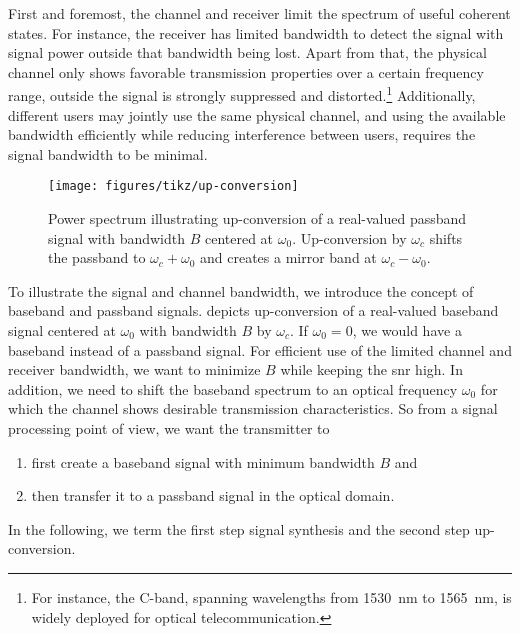 First and foremost, the channel and receiver limit the spectrum of useful coherent states.
For instance, the receiver has limited bandwidth to detect the signal with signal power outside that bandwidth being lost.
Apart from that, the physical channel only shows favorable transmission properties over a certain frequency range, outside the signal is strongly suppressed and distorted.\footnote{For instance, the C-band, spanning wavelengths from \SI{1530}{\nano\meter} to \SI{1565}{\nano\meter}, is widely deployed for optical telecommunication.}
Additionally, different users may jointly use the same physical channel, and using the available bandwidth efficiently while reducing interference between users, requires the signal bandwidth to be minimal.
\begin{figure}[htb]
	\centering
	\texttt{[image: figures/tikz/up-conversion]}
	\caption{Power spectrum illustrating up-conversion of a real-valued passband signal with bandwidth $B$ centered at $\omega_0$. Up-conversion by $\omega_c$ shifts the passband to $\omega_c+\omega_0$ and creates a mirror band at $\omega_c-\omega_0$.}\label{fig:up_conversion}
\end{figure}
To illustrate the signal and channel bandwidth, we introduce the concept of baseband and passband signals\cite[p.~26]{Madhow2008}.
 depicts up-conversion of a real-valued baseband signal centered at $\omega_0$ with bandwidth $B$ by $\omega_c$.
If $\omega_0=0$, we would have a baseband instead of a passband signal.
For efficient use of the limited channel and receiver bandwidth, we want to minimize $B$ while keeping the \gls{snr} high.
In addition, we need to shift the baseband spectrum to an optical frequency $\omega_0$ for which the channel shows desirable transmission characteristics.
So from a signal processing point of view, we want the transmitter to
\begin{enumerate}
	\item first create a baseband signal with minimum bandwidth $B$ and
	\item then transfer it to a passband signal in the optical domain.
\end{enumerate}
In the following, we term the first step signal synthesis and the second step up-conversion.


